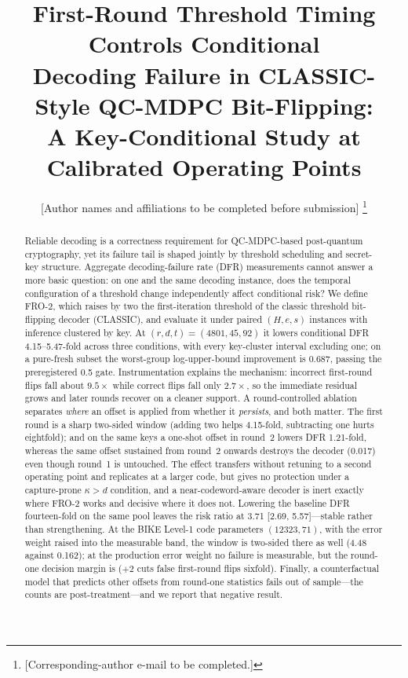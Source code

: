 \documentclass[lettersize,journal]{IEEEtran}
\begin{document}
\title{First-Round Threshold Timing Controls Conditional\\ Decoding Failure in CLASSIC-Style QC-MDPC Bit-Flipping:\\ A Key-Conditional Study at Calibrated Operating Points}

\author{[Author names and affiliations to be completed before submission]%
\thanks{[Corresponding-author e-mail to be completed.]}}

\maketitle

\begin{abstract}

Reliable decoding is a correctness requirement for QC-MDPC-based post-quantum cryptography, yet its failure tail is shaped jointly by threshold scheduling and secret-key structure. Aggregate decoding-failure rate (DFR) measurements cannot answer a more basic question: on one and the same decoding instance, does the temporal configuration of a threshold change independently affect conditional risk? We define FRO-2, which raises by two the first-iteration threshold of the classic threshold bit-flipping decoder (CLASSIC), and evaluate it under paired $(H,e,s)$ instances with inference clustered by key. At $(r,d,t)=(4801,45,92)$ it lowers conditional DFR 4.15--5.47-fold across three conditions, with every key-cluster interval excluding one; on a pure-fresh subset the worst-group log-upper-bound improvement is 0.687, passing the preregistered 0.5 gate. Instrumentation explains the mechanism: incorrect first-round flips fall about $9.5\times$ while correct flips fall only $2.7\times$, so the immediate residual grows and later rounds recover on a cleaner support. A round-controlled ablation separates \emph{where} an offset is applied from whether it \emph{persists}, and both matter. The first round is a sharp two-sided window (adding two helps 4.15-fold, subtracting one hurts eightfold); and on the same keys a one-shot offset in round~2 lowers DFR 1.21-fold, whereas the same offset sustained from round~2 onwards destroys the decoder (0.017) even though round~1 is untouched. The effect transfers without retuning to a second operating point and replicates at a larger code, but gives no protection under a capture-prone $\kappa>d$ condition, and a near-codeword-aware decoder is inert exactly where FRO-2 works and decisive where it does not. Lowering the baseline DFR fourteen-fold on the same pool leaves the risk ratio at 3.71 [2.69, 5.57]---stable rather than strengthening. At the BIKE Level-1 code parameters $(12323,71)$, with the error weight raised into the measurable band, the window is two-sided there as well (4.48 against 0.162); at the production error weight no failure is measurable, but the round-one decision margin is ($+2$ cuts false first-round flips sixfold). Finally, a counterfactual model that predicts other offsets from round-one statistics fails out of sample---the counts are post-treatment---and we report that negative result.
\end{abstract}
\end{document}
